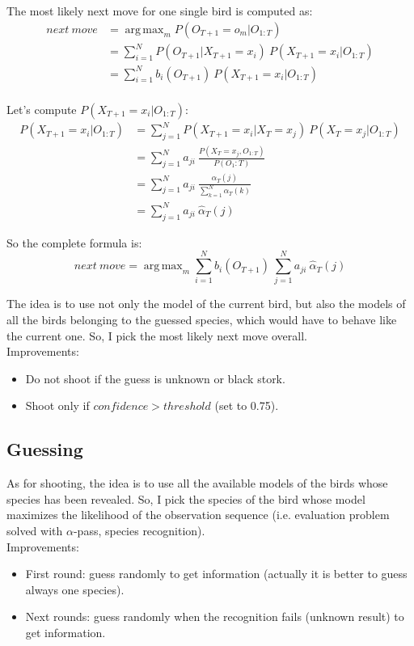 \documentclass{scrartcl}
\DeclareMathOperator*{\argmax}{arg\,max}
\begin{document}
The most likely next move for one single bird is computed as:
\begin{align}
 next\ move &= \argmax_{m} P(O_{T+1}=o_m | O_{1:T}) \nonumber \\
 &= \sum_{i=1}^N P(O_{T+1} | X_{T+1}=x_i)\ P(X_{T+1}=x_i | O_{1:T}) \nonumber \\
 &= \sum_{i=1}^N b_i(O_{T+1})\ P(X_{T+1}=x_i | O_{1:T}) \nonumber \\
\end{align}

Let's compute $P(X_{T+1}=x_i | O_{1:T})$:
\begin{align}
 P(X_{T+1}=x_i | O_{1:T}) &= \sum_{j=1}^N P(X_{T+1}=x_i | X_T=x_j)\ P(X_T=x_j | O_{1:T}) \nonumber \\
 &= \sum_{j=1}^N a_{ji}\ \frac{P(X_T=x_j, O_{1:T})}{P(O_1:T)} \nonumber \\
 &= \sum_{j=1}^N a_{ji}\ \frac{\alpha_T(j)}{\sum_{k=1}^N \alpha_T(k)} \\
 &= \sum_{j=1}^N a_{ji}\ \hat{\alpha}_T(j)
\end{align}

So the complete formula is:
\begin{equation}
 next\ move = \argmax_{m} \sum_{i=1}^N b_i(O_{T+1})\ \sum_{j=1}^N a_{ji}\ \hat{\alpha}_T(j)
\end{equation}

The idea is to use not only the model of the current bird, but also the models of all the birds belonging to the guessed species, which would have to behave like the current one. So, I pick the most likely next move overall. \\

Improvements:
\begin{itemize}
 \item Do not shoot if the guess is unknown or black stork.
 \item Shoot only if $confidence > threshold$ (set to 0.75).
\end{itemize}

\subsection{Guessing}
As for shooting, the idea is to use all the available models of the birds whose species has been revealed. So, I pick the species of the bird whose model maximizes the likelihood of the observation sequence (i.e. evaluation problem solved with $\alpha$-pass, species recognition). \\

Improvements:
\begin{itemize}
 \item First round: guess randomly to get information (actually it is better to guess always one species).
 \item Next rounds: guess randomly when the recognition fails (unknown result) to get information.
\end{itemize}


\clearpage
\newpage
\printbibliography
\end{document}
